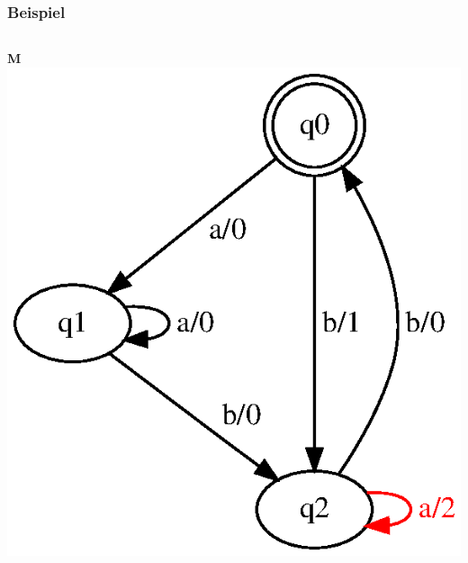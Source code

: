 \documentclass[10pt]{beamer}
\begin{document}
\begin{frame}
\frametitle{Beispiel}
\begin{columns}[T] %

\begin{column}{.50\textwidth}
\textbf{M}
\includegraphics[width=\textwidth]{images/fsm-example01}
\end{column}%


\end{columns}
\end{frame}
\end{document}
